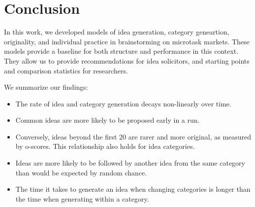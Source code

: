 



\section{Conclusion}

In this work, we developed models of idea generation, category geneartion, originality, and individual practice in brainstorming on microtask markets.
These models provide a baseline for both structure and performance in this context. They allow us to provide recommendations for idea solicitors, and starting points and comparison statistics for researchers.

 We summarize our findings:

\begin{itemize}
\item The rate of idea and category generation decays non-linearly over time. 
\item Common ideas are more likely to be proposed early in a run. 
\item Conversely, ideas beyond the first 20 are rarer and more original, as measured by o-scores. This relationship also holds for idea categories.
\item Ideas are more likely to be followed by another idea from the same category than would be expected by random chance.
\item The time it takes to generate an idea when changing categories is longer than the time when generating within a category.
\end{itemize}
